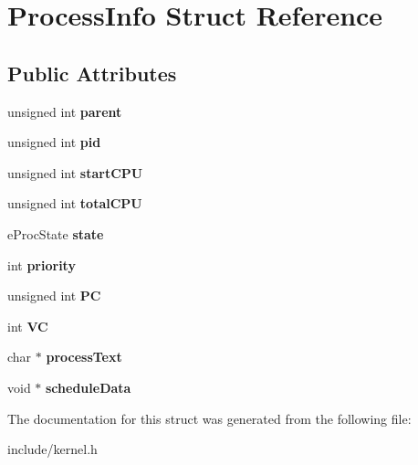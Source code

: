 \hypertarget{structProcessInfo}{\section{\-Process\-Info \-Struct \-Reference}
\label{dd/dc8/structProcessInfo}
}
\subsection*{\-Public \-Attributes}
\begin{DoxyCompactItemize}
\item 
\hypertarget{structProcessInfo_a102b9e7e7d958b508cec182bbcaf7d85}{unsigned int {\bfseries parent}}\label{dd/dc8/structProcessInfo_a102b9e7e7d958b508cec182bbcaf7d85}

\item 
\hypertarget{structProcessInfo_ab522cec1e6f7f3b6a7780e6b4611c1f4}{unsigned int {\bfseries pid}}\label{dd/dc8/structProcessInfo_ab522cec1e6f7f3b6a7780e6b4611c1f4}

\item 
\hypertarget{structProcessInfo_ac1e6244dd31274040bdf7ad7ee40db4a}{unsigned int {\bfseries start\-C\-P\-U}}\label{dd/dc8/structProcessInfo_ac1e6244dd31274040bdf7ad7ee40db4a}

\item 
\hypertarget{structProcessInfo_a8a6eda10132e07b1596c09822724b0c7}{unsigned int {\bfseries total\-C\-P\-U}}\label{dd/dc8/structProcessInfo_a8a6eda10132e07b1596c09822724b0c7}

\item 
\hypertarget{structProcessInfo_a748790bb8c3ef5d2dff552f35b81298e}{e\-Proc\-State {\bfseries state}}\label{dd/dc8/structProcessInfo_a748790bb8c3ef5d2dff552f35b81298e}

\item 
\hypertarget{structProcessInfo_a2f9f55dc3548d0bed66e06db8f47d958}{int {\bfseries priority}}\label{dd/dc8/structProcessInfo_a2f9f55dc3548d0bed66e06db8f47d958}

\item 
\hypertarget{structProcessInfo_a9b2d3f321f21ec1ee97c8dd5e63ac6c8}{unsigned int {\bfseries \-P\-C}}\label{dd/dc8/structProcessInfo_a9b2d3f321f21ec1ee97c8dd5e63ac6c8}

\item 
\hypertarget{structProcessInfo_ab288b59e794cb506663e22c680e05c2d}{int {\bfseries \-V\-C}}\label{dd/dc8/structProcessInfo_ab288b59e794cb506663e22c680e05c2d}

\item 
\hypertarget{structProcessInfo_ae99b529cb79a446c0ff0d1a851b67fc5}{char $\ast$ {\bfseries process\-Text}}\label{dd/dc8/structProcessInfo_ae99b529cb79a446c0ff0d1a851b67fc5}

\item 
\hypertarget{structProcessInfo_aea1c50ae92f6421ae5c94ac674c1877a}{void $\ast$ {\bfseries schedule\-Data}}\label{dd/dc8/structProcessInfo_aea1c50ae92f6421ae5c94ac674c1877a}

\end{DoxyCompactItemize}


\-The documentation for this struct was generated from the following file\-:\begin{DoxyCompactItemize}
\item 
include/kernel.\-h\end{DoxyCompactItemize}
